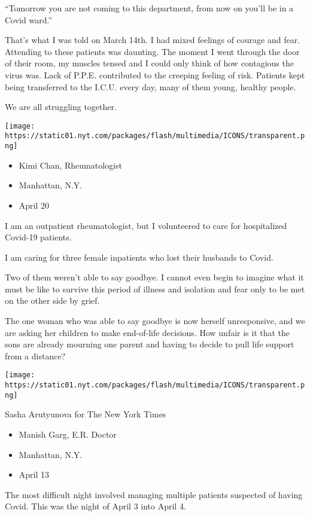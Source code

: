 ``Tomorrow you are not coming to this department, from now on you'll be
in a Covid ward.''

That's what I was told on March 14th. I had mixed feelings of courage
and fear. Attending to these patients was daunting. The moment I went
through the door of their room, my muscles tensed and I could only think
of how contagious the virus was. Lack of P.P.E. contributed to the
creeping feeling of risk. Patients kept being transferred to the I.C.U.
every day, many of them young, healthy people.

We are all struggling together.

\texttt{[image: https://static01.nyt.com/packages/flash/multimedia/ICONS/transparent.png]}

\begin{itemize}
\tightlist
\item
  Kimi Chan, Rheumatologist
\item
  Manhattan, N.Y.
\item
  April 20
\end{itemize}

I am an outpatient rheumatologist, but I volunteered to care for
hospitalized Covid-19 patients.

I am caring for three female inpatients who lost their husbands to
Covid.

Two of them weren't able to say goodbye. I cannot even begin to imagine
what it must be like to survive this period of illness and isolation and
fear only to be met on the other side by grief.

The one woman who was able to say goodbye is now herself unresponsive,
and we are asking her children to make end-of-life decisions. How unfair
is it that the sons are already mourning one parent and having to decide
to pull life support from a distance?

\texttt{[image: https://static01.nyt.com/packages/flash/multimedia/ICONS/transparent.png]}

Sasha Arutyunova for The New York Times

\begin{itemize}
\tightlist
\item
  Manish Garg, E.R. Doctor
\item
  Manhattan, N.Y.
\item
  April 13
\end{itemize}

The most difficult night involved managing multiple patients suspected
of having Covid. This was the night of April 3 into April 4.

